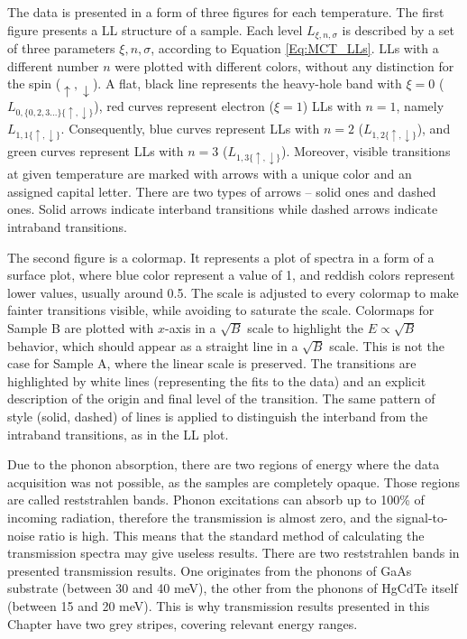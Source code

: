 \documentclass[titlepage,a4paper]{book}
\begin{document}
The data is presented in a form of three figures for each temperature. The first figure presents a LL structure of a sample. Each level $L_{\xi,n,\sigma}$ is described by a set of three parameters $\xi,n,\sigma$, according to Equation \ref{Eq:MCT_LLs}. LLs with a different number $n$ were plotted with different colors, without any distinction for the spin ($\uparrow,\downarrow$). A flat, black line represents the heavy-hole band with $\xi = 0$ ($L_{0,\{0,2,3...\}\{\uparrow,\downarrow\}}$), red curves represent electron ($\xi = 1$) LLs with $n = 1$, namely $L_{1,1\{\uparrow,\downarrow\}}$. Consequently, blue curves represent LLs with $n = 2$ ($L_{1,2\{\uparrow,\downarrow\}}$), and green curves represent LLs with $n = 3$ ($L_{1,3\{\uparrow,\downarrow\}}$). Moreover, visible transitions at given temperature are marked with arrows with a unique color and an assigned capital letter. There are two types of arrows -- solid ones and dashed ones. Solid arrows indicate interband transitions while dashed arrows indicate intraband transitions. 

The second figure is a colormap. It represents a plot of spectra in a form of a surface plot, where blue color represent a value of 1, and reddish colors represent lower values, usually around 0.5. The scale is adjusted to every colormap to make fainter transitions visible, while avoiding to saturate the scale. Colormaps for Sample B are plotted with $x$-axis in a $\sqrt{B}$ scale to highlight the $E \propto \sqrt{B}$ behavior, which should appear as a straight line in a $\sqrt{B}$ scale. This is not the case for Sample A, where the linear scale is preserved. The transitions are highlighted by white lines (representing the fits to the data) and an explicit description of the origin and final level of the transition. The same pattern of style (solid, dashed) of lines is applied to distinguish the interband from the intraband transitions, as in the LL plot. 

Due to the phonon absorption, there are two regions of energy where the data acquisition was not possible, as the samples are completely opaque. Those regions are called reststrahlen bands. Phonon excitations can absorb up to 100\% of incoming radiation, therefore the transmission is almost zero, and the signal-to-noise ratio is high. This means that the standard method of calculating the transmission spectra may give useless results. There are two reststrahlen bands in presented transmission results. One originates from the phonons of GaAs substrate (between 30 and 40 meV), the other from the phonons of HgCdTe itself (between 15 and 20 meV). This is why transmission results presented in this Chapter have two grey stripes, covering relevant energy ranges. 
\end{document}
